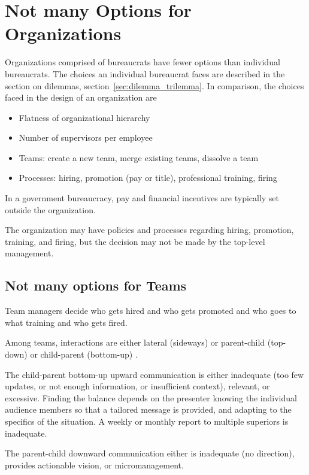 \section{Not many Options for Organizations}

Organizations comprised of bureaucrats have fewer options than individual bureaucrats. The choices an individual bureaucrat faces are described in the section on dilemmas, section~\ref{sec:dilemma_trilemma}. In comparison, the choices faced in the design of an organization are
\begin{itemize}
    \item Flatness of organizational hierarchy
    \item Number of supervisors per employee
    \item Teams: create a new team, merge existing teams, dissolve a team
    \item Processes: hiring, promotion (pay or title), professional training, firing
\end{itemize}
In a government bureaucracy, pay and financial incentives are typically set outside the organization.

The organization may have policies and processes regarding hiring, promotion, training, and firing, but the decision may not be made by the top-level management. 

\subsection*{Not many options for Teams}

Team managers decide who gets hired and who gets promoted and who goes to what training and who gets fired.

Among teams, interactions are either lateral (sideways) or parent-child (top-down) or child-parent (bottom-up) \cite{2014_Jorgensen}.

The child-parent bottom-up upward communication is either inadequate (too few updates, or not enough information, or insufficient context), relevant, or excessive. Finding the balance depends on the presenter knowing the individual audience members so that a tailored message is provided, and adapting to the specifics of the situation. A weekly or monthly report to multiple superiors is inadequate. 

The parent-child downward communication either is inadequate (no direction), provides actionable vision, or micromanagement. 

